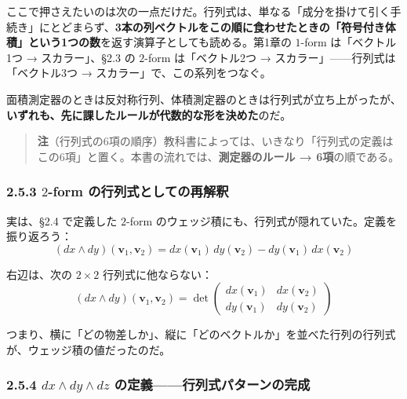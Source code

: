 \documentclass[a4paper,12pt,openany]{book}
\begin{document}
ここで押さえたいのは次の一点だけだ。行列式は、単なる「成分を掛けて引く手続き」にとどまらず、\textbf{3本の列ベクトルをこの順に食わせたときの「符号付き体積」という1つの数}を返す演算子としても読める。第1章の
\(1\)-form は「ベクトル1つ → スカラー」、§2.3 の \(2\)-form
は「ベクトル2つ → スカラー」——行列式は「ベクトル3つ →
スカラー」で、この系列をつなぐ。

面積測定器のときは反対称行列、体積測定器のときは行列式が立ち上がったが、\textbf{いずれも、先に課したルールが代数的な形を決めた}のだ。

\begin{quote}
\textbf{注}（行列式の6項の順序）教科書によっては、いきなり「行列式の定義はこの6項」と置く。本書の流れでは、\textbf{測定器のルール → 6項}の順である。
\end{quote}

\hypertarget{form-ux306eux884cux5217ux5f0fux3068ux3057ux3066ux306eux518dux89e3ux91c8}{%
\subsubsection{\texorpdfstring{2.5.3 \(2\)-form
の行列式としての再解釈}{2.5.3 2-form の行列式としての再解釈}}\label{form-ux306eux884cux5217ux5f0fux3068ux3057ux3066ux306eux518dux89e3ux91c8}}

実は、§2.4 で定義した \(2\)-form
のウェッジ積にも、行列式が隠れていた。定義を振り返ろう：
\[(dx \wedge dy)(\mathbf{v}_1, \mathbf{v}_2) = dx(\mathbf{v}_1)\,dy(\mathbf{v}_2) - dy(\mathbf{v}_1)\,dx(\mathbf{v}_2)\]

右辺は、次の \(2 \times 2\) 行列式に他ならない：
\[(dx \wedge dy)(\mathbf{v}_1, \mathbf{v}_2) = \det\begin{pmatrix} dx(\mathbf{v}_1) & dx(\mathbf{v}_2) \\ dy(\mathbf{v}_1) & dy(\mathbf{v}_2) \end{pmatrix}\]

つまり、横に「どの物差しか」、縦に「どのベクトルか」を並べた行列の行列式が、ウェッジ積の値だったのだ。

\hypertarget{dx-wedge-dy-wedge-dz-ux306eux5b9aux7fa9ux884cux5217ux5f0fux30d1ux30bfux30fcux30f3ux306eux5b8cux6210}{%
\subsubsection{\texorpdfstring{2.5.4 \(dx \wedge dy \wedge dz\)
の定義——行列式パターンの完成}{2.5.4 dx \textbackslash wedge dy \textbackslash wedge dz の定義——行列式パターンの完成}}\label{dx-wedge-dy-wedge-dz-ux306eux5b9aux7fa9ux884cux5217ux5f0fux30d1ux30bfux30fcux30f3ux306eux5b8cux6210}}
\end{document}
